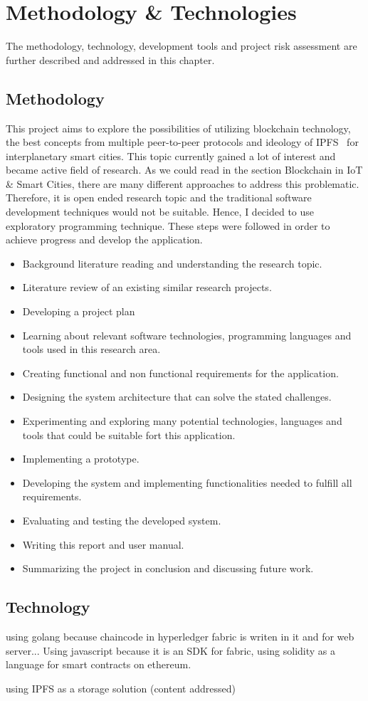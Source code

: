 \chapter{Methodology \& Technologies\label{chap:technology}}
\quad The methodology, technology, development tools and project risk assessment are further described and addressed in this chapter.

\section{Methodology}
This project aims to explore the possibilities of utilizing blockchain technology, the best concepts from multiple peer-to-peer protocols and ideology of IPFS~\cite{labs_ipfs_nodate} for interplanetary smart cities. This topic currently gained a lot of interest and became active field of research. As we could read in the section Blockchain in IoT \& Smart Cities, there are many different approaches to address this problematic. Therefore, it is open ended research topic and the traditional software development techniques would not be suitable. Hence, I decided to use exploratory programming technique. These steps were followed in order to achieve progress and develop the application.

\begin{itemize}
\item Background literature reading and understanding the research topic.
\item Literature review of an existing similar research projects.
\item Developing a project plan
\item Learning about relevant software technologies, programming languages and tools used in this research area.
\item Creating functional and non functional requirements for the application.
\item Designing the system architecture that can solve the stated challenges.
\item Experimenting and exploring many potential technologies, languages and tools that could be suitable fort this application.
\item Implementing a prototype.
\item Developing the system and implementing functionalities needed to fulfill all requirements.
\item Evaluating and testing  the developed system.
\item Writing this report and user manual.
\item  Summarizing the project in conclusion and discussing future work.
\end{itemize}


\section{Technology}
\quad 
using golang because chaincode in hyperledger fabric is writen in it and for web server... Using javascript because it is an SDK for fabric, using solidity as a language for smart contracts on ethereum.

using IPFS as a storage solution (content addressed)

